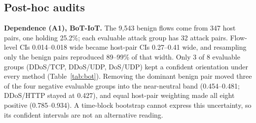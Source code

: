 \documentclass[preprint,12pt]{elsarticle}
\begin{document}
\subsection{Post-hoc audits}\label{sec:audits}

\textbf{Dependence (A1), BoT-IoT.} The 9{,}543 benign flows come from 347 host pairs, one holding 25.2\%; each evaluable attack group has 32 attack pairs. Flow-level CIs 0.014--0.018 wide became host-pair CIs 0.27--0.41 wide, and resampling only the benign pairs reproduced 89--99\% of that width. Only 3 of 8 evaluable groups (DDoS/TCP, DDoS/UDP, DoS/UDP) kept a confident orientation under every method (Table~\ref{tab:bot}). Removing the dominant benign pair moved three of the four negative evaluable groups into the near-neutral band (0.454--0.481; DDoS/HTTP stayed at 0.427), and equal host-pair weighting made all eight positive (0.785--0.934). A time-block bootstrap cannot express this uncertainty, so its confident intervals are not an alternative reading.

\begin{table}[!t]
\caption{BoT-IoT, $AUC_{signed}$ of $A_{bytes}$ against all Normal flows: preregistered flow-level and host-pair 95\% CIs, equal-host-pair-weight estimate, estimate without the largest benign host pair, and whether every computable method is confident (A1). n/c: not computable. TCP/UDP: hping3 floods; HTTP: GoldenEye floods.\label{tab:bot}}
\centering\scriptsize
{}
\end{table}
\end{document}
